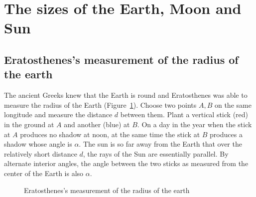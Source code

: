 
\section{The sizes of the Earth, Moon and Sun}\label{s.aristarchus}


\subsection{Eratosthenes's measurement of the radius of the earth}\label{s.eratosthenes}

The ancient Greeks knew that the Earth is round and Eratosthenes was able to measure the radius of the Earth (Figure~\ref{f.eratosthenes}). Choose two points $A,B$ on the same longitude and measure the distance $d$ between them. Plant a vertical stick (red) in the ground at $A$ and another (blue) at $B$. On a day in the year when the stick at $A$ produces no shadow at noon, at the same time the stick at $B$ produces a shadow whose angle is $\alpha$. The sun is so far away from the Earth that over the relatively short distance $d$, the rays of the Sun are essentially parallel. By alternate interior angles, the angle between the two sticks as measured from the center of the Earth is also $\alpha$.

\begin{figure}[b]
\begin{center}
\caption{Eratosthenes's measurement of the radius of the earth}
\label{f.eratosthenes}
\end{center}
\end{figure}

